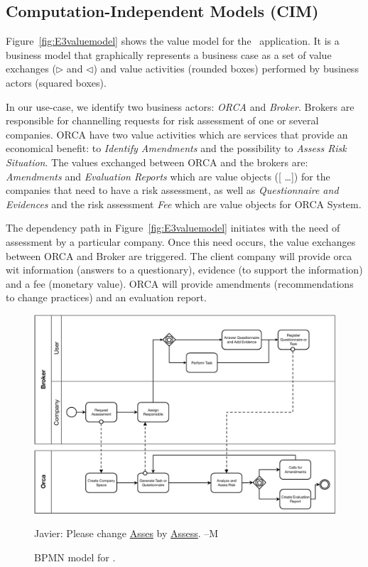 \subsection{Computation-Independent Models (CIM)}

Figure~\ref{fig:E3valuemodel} shows the value model for the \FlyingPig\ application.
It is a business model that graphically represents a business case as a set of value exchanges ($\triangleright$ and $\triangleleft$) and value activities (rounded boxes) performed by business actors (squared boxes).

In our use-case, we identify two business actors: \textsl{ORCA} and \textsl{Broker}. 
Brokers are responsible for channelling requests for risk assessment of one or several companies. 
ORCA have two value activities which are services that provide an economical benefit: to \textsl{Identify Amendments} and the possibility to \textsl{Assess Risk Situation}. 
The values exchanged between ORCA and the brokers are: \textsl{Amendments} and \textsl{Evaluation Reports} which are value objects ([ \!\dots]) for the companies that need to have a risk assessment, as well as  \textsl{Questionnaire and Evidences} and the risk assessment \textsl{Fee} which are value objects for ORCA System.



The dependency path in Figure~\ref{fig:E3valuemodel} initiates with the need of assessment by a particular company. 
Once this need occurs, the value exchanges between ORCA and Broker are triggered. 
The client company will provide orca wit information (answers to a questionary), evidence (to support the information) and a fee (monetary value).
ORCA will provide amendments (recommendations to change practices) and an evaluation report. 

\begin{figure}[t]
\centering
\includegraphics[width=1.0\textwidth]{figs/BPMN_GCP.pdf}

{\color{red} Javier: Please change \underline{Asses} by \underline{Assess}. --M}
\caption{BPMN model for \FlyingPig.\label{fig:BPMNmodel}}
\end{figure}

